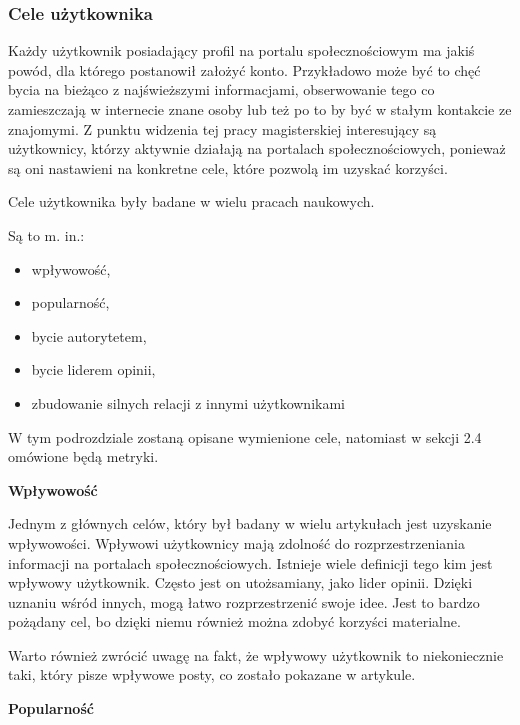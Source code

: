 \documentclass[polish,12pt]{aghthesis}
\begin{document}
\subsubsection{Cele użytkownika}
Każdy użytkownik posiadający profil na portalu społecznościowym ma jakiś powód, dla którego postanowił założyć konto.  Przykładowo może być to chęć bycia na bieżąco z najświeższymi informacjami, obserwowanie tego co zamieszczają w internecie znane osoby lub też po to by być w stałym kontakcie ze znajomymi. Z punktu widzenia tej pracy magisterskiej interesujący są użytkownicy, którzy aktywnie działają na portalach społecznościowych, ponieważ są oni nastawieni na konkretne cele, które pozwolą im uzyskać korzyści.

Cele użytkownika były badane w wielu pracach naukowych. 

Są to m. in.:
\begin{itemize}
    \item wpływowość,
    \item popularność,
    \item bycie autorytetem,
    \item bycie liderem opinii,
    \item zbudowanie silnych relacji z innymi użytkownikami
\end{itemize}{}

W tym podrozdziale zostaną opisane wymienione cele, natomiast w sekcji 2.4 omówione będą metryki.

\vspace{30mm}

\noindent
\textbf{Wpływowość}

Jednym z głównych celów, który był badany w wielu artykułach\cite{measure} \cite{digitalComm} \cite{measureMill} \cite{spread}\cite{activeMiccroblogers} jest uzyskanie wpływowości. Wpływowi użytkownicy mają zdolność do rozprzestrzeniania informacji na portalach społecznościowych. Istnieje wiele definicji tego kim jest wpływowy użytkownik. Często jest on utożsamiany, jako lider opinii. Dzięki uznaniu wśród innych, mogą łatwo rozprzestrzenić swoje idee. Jest to bardzo pożądany cel, bo dzięki niemu również można zdobyć korzyści materialne. 

Warto również zwrócić uwagę na fakt, że wpływowy użytkownik to niekoniecznie taki, który pisze wpływowe posty, co zostało pokazane w artykule\cite{influenceOrNot}.

\vspace{5mm}

\noindent
\textbf{Popularność}
\end{document}
